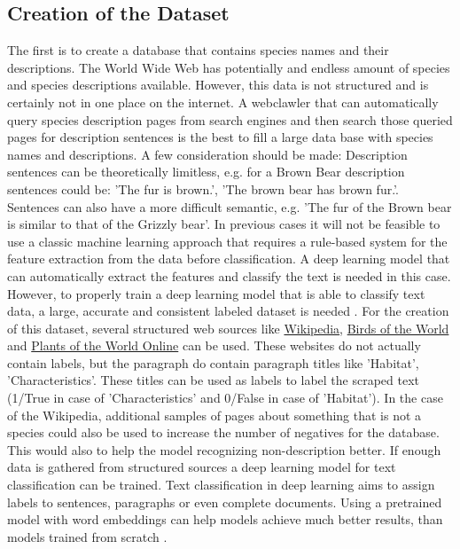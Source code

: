 \documentclass{article}
\begin{document}
\subsection{Creation of the Dataset}
The first is to create a database that contains species names and their descriptions.
The World Wide Web has potentially and endless amount of species and species descriptions available.
However, this data is not structured and is certainly not in one place on the internet.
A webclawler that can automatically query species description pages from search engines and then search those queried pages for description sentences is the best to fill a large data base with species names and descriptions. 
A few consideration should be made:
Description sentences can be theoretically limitless, e.g. for a Brown Bear description sentences could be: 'The fur is brown.', 'The brown bear has brown fur.'.
Sentences can also have a more difficult semantic, e.g. 'The fur of the Brown bear is similar to that of the Grizzly bear'.
In previous cases it will not be feasible to use a classic machine learning approach that requires a rule-based system for the feature extraction from the data before classification. 
A deep learning model that can automatically extract the features and classify the text is needed in this case.
However, to properly train a deep learning model that is able to classify text data, a large, accurate and consistent labeled dataset is needed \cite{munappy_data_2019}.
For the creation of this dataset, several structured web sources like \href{http://www.Wikipedia.com}{Wikipedia}, \href{https://birdsoftheworld.org}{Birds of the World} and \href{http://powo.science.kew.org/}{Plants of the World Online} can be used.
These websites do not actually contain labels, but the paragraph do contain paragraph titles like 'Habitat', 'Characteristics'. 
These titles can be used as labels to label the scraped text (1/True in case of 'Characteristics' and 0/False in case of 'Habitat').
In the case of the Wikipedia, additional samples of pages about something that is not a species could also be used to increase the number of negatives for the database.
This would also to help the model recognizing non-description better.
If enough data is gathered from structured sources a deep learning model for text classification can be trained.
Text classification in deep learning aims to assign labels to sentences, paragraphs or even complete documents. 
Using a pretrained model with word embeddings can help models achieve much better results, than models trained from scratch \cite{mikolov_distributed_2013}.
\end{document}
